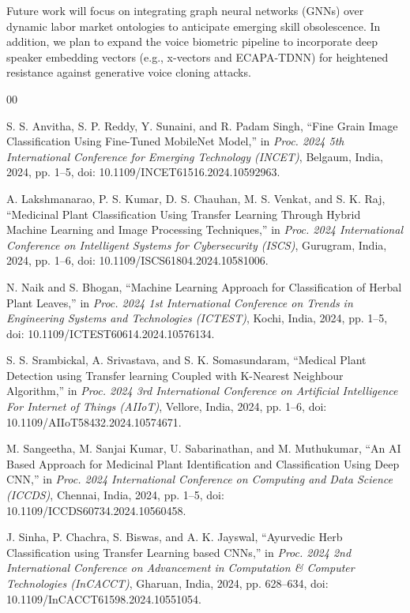 \documentclass[conference]{IEEEtran}
\begin{document}
Future work will focus on integrating graph neural networks (GNNs) over dynamic labor market ontologies to anticipate emerging skill obsolescence. In addition, we plan to expand the voice biometric pipeline to incorporate deep speaker embedding vectors (e.g., x-vectors and ECAPA-TDNN) for heightened resistance against generative voice cloning attacks.

\begin{thebibliography}{00}

S. S. Anvitha, S. P. Reddy, Y. Sunaini, and R. Padam Singh, ``Fine Grain Image Classification Using Fine-Tuned MobileNet Model,'' in \textit{Proc. 2024 5th International Conference for Emerging Technology (INCET)}, Belgaum, India, 2024, pp. 1--5, doi: 10.1109/INCET61516.2024.10592963.

A. Lakshmanarao, P. S. Kumar, D. S. Chauhan, M. S. Venkat, and S. K. Raj, ``Medicinal Plant Classification Using Transfer Learning Through Hybrid Machine Learning and Image Processing Techniques,'' in \textit{Proc. 2024 International Conference on Intelligent Systems for Cybersecurity (ISCS)}, Gurugram, India, 2024, pp. 1--6, doi: 10.1109/ISCS61804.2024.10581006.

N. Naik and S. Bhogan, ``Machine Learning Approach for Classification of Herbal Plant Leaves,'' in \textit{Proc. 2024 1st International Conference on Trends in Engineering Systems and Technologies (ICTEST)}, Kochi, India, 2024, pp. 1--5, doi: 10.1109/ICTEST60614.2024.10576134.

S. S. Srambickal, A. Srivastava, and S. K. Somasundaram, ``Medical Plant Detection using Transfer learning Coupled with K-Nearest Neighbour Algorithm,'' in \textit{Proc. 2024 3rd International Conference on Artificial Intelligence For Internet of Things (AIIoT)}, Vellore, India, 2024, pp. 1--6, doi: 10.1109/AIIoT58432.2024.10574671.

M. Sangeetha, M. Sanjai Kumar, U. Sabarinathan, and M. Muthukumar, ``An AI Based Approach for Medicinal Plant Identification and Classification Using Deep CNN,'' in \textit{Proc. 2024 International Conference on Computing and Data Science (ICCDS)}, Chennai, India, 2024, pp. 1--5, doi: 10.1109/ICCDS60734.2024.10560458.

J. Sinha, P. Chachra, S. Biswas, and A. K. Jayswal, ``Ayurvedic Herb Classification using Transfer Learning based CNNs,'' in \textit{Proc. 2024 2nd International Conference on Advancement in Computation \& Computer Technologies (InCACCT)}, Gharuan, India, 2024, pp. 628--634, doi: 10.1109/InCACCT61598.2024.10551054.


\end{thebibliography}
\end{document}
